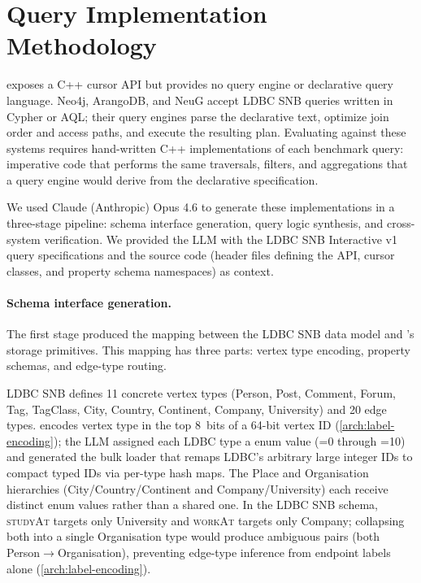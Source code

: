 \section{Query Implementation Methodology}
\label{sec:eval:query-impl}

\project{} exposes a C++ cursor API but provides no query engine or declarative query language.
Neo4j, ArangoDB, and NeuG accept LDBC SNB queries written in Cypher or AQL; their query engines parse the declarative text, optimize join order and access paths, and execute the resulting plan.
Evaluating \project{} against these systems requires hand-written C++ implementations of each benchmark query: imperative code that performs the same traversals, filters, and aggregations that a query engine would derive from the declarative specification.

We used Claude (Anthropic) Opus 4.6 \cite{anthropic2026claudecodedocs} to generate these implementations in a three-stage pipeline: schema interface generation, query logic synthesis, and cross-system verification.
We provided the LLM with the LDBC SNB Interactive v1 query specifications and the \project{} source code (header files defining the  API, cursor classes, and property schema namespaces) as context.

\paragraph{Schema interface generation.}
The first stage produced the mapping between the LDBC SNB data model and \project{}'s storage primitives.
This mapping has three parts: vertex type encoding, property schemas, and edge-type routing.

LDBC SNB defines 11 concrete vertex types (Person, Post, Comment, Forum, Tag, TagClass, City, Country, Continent, Company, University) and 20 edge types.
\project{} encodes vertex type in the top 8~bits of a 64-bit vertex ID (\autoref{arch:label-encoding}); the LLM assigned each LDBC type a  enum value (=0 through =10) and generated the bulk loader that remaps LDBC's arbitrary large integer IDs to compact typed IDs via per-type hash maps.
The Place and Organisation hierarchies (City/Country/Continent and Company/University) each receive distinct enum values rather than a shared one.
In the LDBC SNB schema, \textsc{studyAt} targets only University and \textsc{workAt} targets only Company; collapsing both into a single Organisation type would produce ambiguous  pairs (both Person$\to$Organisation), preventing edge-type inference from endpoint labels alone (\autoref{arch:label-encoding}).

